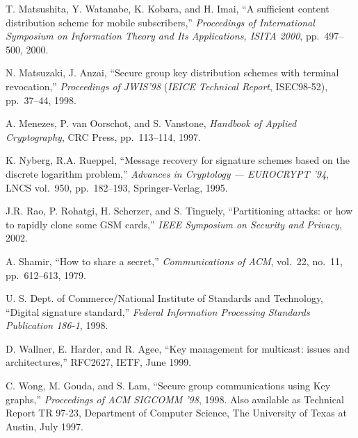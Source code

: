 \documentclass{ims9x6}
\begin{document}
\begin{thebibliography}{00}
 T. Matsushita, Y. Watanabe, K. Kobara, and
H. Imai, ``A sufficient \hbox{content} distribution scheme for mobile
subscribers,'' {\em Proceedings of International Symposium on
Information Theory and Its Applications, ISITA 2000}, pp.~497--500,
2000.

 N. Matsuzaki, J. Anzai, ``Secure group key
distribution schemes with terminal revocation,'' {\em Proceedings of
JWIS'98} ({\em IEICE Technical Report}, ISEC98-52), pp.~37--44, 1998.

 A. Menezes, P. van Oorschot, and S. Vanstone, {\em
Handbook of Applied Cryptography}, CRC Press, pp.~113--114, 1997.

 K. Nyberg, R.A. Rueppel, ``Message recovery for
signature schemes based on the discrete logarithm problem,'' {\em
Advances in Cryptology --- EUROCRYPT '94}, LNCS vol.~950,
pp.~182--193, Springer-Verlag, 1995.

 J.R. Rao, P. Rohatgi, H. Scherzer, and S. Tinguely,
``Partitioning attacks: or how to rapidly clone some GSM cards,'' {\em
IEEE Symposium on Security and Privacy}, 2002.
\eject

 A. Shamir, ``How to share a secret,'' {\em
Communications of ACM}, vol.~22, no.~11, pp.~612--613, 1979.

 U. S. Dept. of Commerce/National Institute of
Standards and Technology, ``Digital signature standard,'' {\em Federal
Information Processing Standards Publication 186-1}, 1998.

 D. Wallner, E. Harder, and R. Agee, ``Key management
for multicast: issues and architectures,'' RFC2627, IETF, June 1999.

 C. Wong, M. Gouda, and S. Lam, ``Secure group
communications using Key graphs,'' {\em Proceedings of ACM SIGCOMM
'98}, 1998. Also available as Technical Report TR 97-23, Department of
Computer Science, The University of Texas at Austin, July 1997.
\end{thebibliography}
\end{document}
